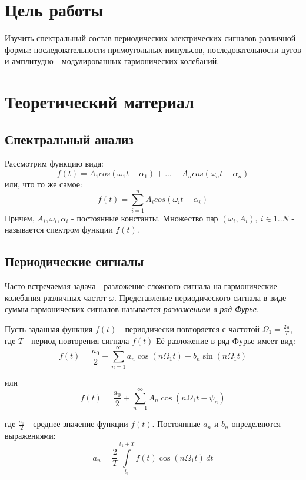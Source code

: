 \documentclass[a4paper, 12pt]{article}
\begin{document}
\section{Цель работы}

Изучить спектральный состав периодических электрических сигналов различной формы: последовательности прямоугольных импульсов, последовательности цугов и амплитудно - модулированных гармонических колебаний.

\section{Теоретический материал}

\subsection{Спектральный анализ}

Рассмотрим функцию вида:
$$f(t) = A_{1}cos(\omega_1t-\alpha_{1}) + ... + A_{n}cos(\omega_{n}t-\alpha_{n})$$
или, что то же самое:
$$f(t) = \sum\limits_{i=1}^n A_{i}cos(\omega_{i}t-\alpha_{i})$$
Причем, $A_{i}, \omega_{i}, \alpha_{i}$ - постоянные константы. Множество пар $(\omega_{i}, A_{i}), \: i \in 1..N$ - называется спектром функции $f(t)$.

\subsection{Периодические сигналы}

Часто встречаемая задача - разложение сложного сигнала на гармонические колебания различных частот $\omega$. Представление периодического сигнала в виде суммы гармонических сигналов называется {\it{разложением в ряд Фурье}}.

Пусть заданная функция $f(t)$ - периодически повторяется с частотой $\Omega_{1}=\frac{2\pi}{T}$, где $T$ - период повторения сигнала $f(t)$
Её разложение в ряд Фурье имеет вид:
\begin{equation}
\label{form:furie}	
	f(t)=\frac{a_{0}}{2}+\sum\limits_{n=1}^{\infty}a_{n}\cos(n\Omega_{1}t)+b_{n}\sin(n\Omega_{1}t) 
\end{equation}

или
\begin{equation}
	f(t)=\frac{a_{0}}{2}+\sum\limits_{n=1}^{\infty}A_{n}\cos(n\Omega_{1}t-\psi_{n}) 
\label{form:furie_2}
\end{equation}

где $\frac{a_{0}}{2}$ - среднее значение функции $f(t)$. Постоянные $a_n$ и $b_n$ определяются выражениями:
\begin{equation}
\label{form:a_n}
	a_{n} = \frac{2}{T}\int\limits_{t_{1}}^{t_{1}+T}f(t)\cos(n\Omega_1t)\, dt
\end{equation}
\end{document}
